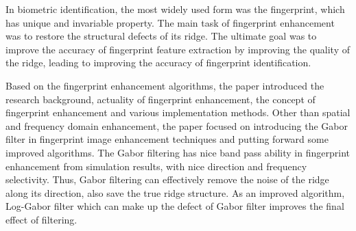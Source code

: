 \begin{abstract*}
In biometric identification, the most widely used form was the fingerprint, which has unique and invariable property. The main task of fingerprint enhancement was to restore the structural defects of its ridge. The ultimate goal was to improve the accuracy of fingerprint feature extraction by improving the quality of the ridge, leading to improving the accuracy of fingerprint identification.

Based on the fingerprint enhancement algorithms, the paper introduced the research background, actuality of fingerprint enhancement, the concept of fingerprint enhancement and various implementation methods. Other than spatial and frequency domain enhancement, the paper focused on introducing the Gabor filter in fingerprint image enhancement techniques and putting forward some improved algorithms. The Gabor filtering has nice band pass ability in fingerprint enhancement from simulation results, with nice direction and frequency selectivity. Thus, Gabor filtering can effectively remove the noise of the ridge along its direction, also save the true ridge structure. As an improved algorithm, Log-Gabor filter which can make up the defect of Gabor filter improves the final effect of filtering.

\end{abstract*}
